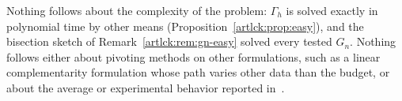 Nothing follows about the complexity of the problem: $\Gamma_h$ is solved exactly in polynomial time by other means (Proposition~\ref{artlck:prop:easy}), and the bisection sketch of Remark~\ref{artlck:rem:gn-easy} solved every tested $G_n$. Nothing follows
either about pivoting methods on other formulations, such as a linear complementarity formulation whose
path varies other data than the budget, or about the average or experimental behavior reported
in~\cite{lck16}.
